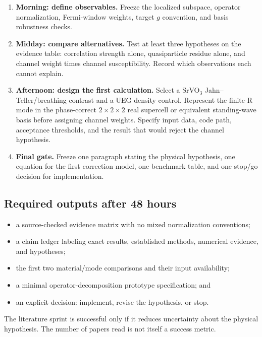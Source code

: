 \begin{enumerate}
  \item \textbf{Morning: define observables.}  Freeze the localized subspace,
  operator normalization, Fermi-window weights, target $g$ convention, and basis
  robustness checks.
  \item \textbf{Midday: compare alternatives.}  Test at least three hypotheses on
  the evidence table: correlation strength alone, quasiparticle residue alone,
  and channel weight times channel susceptibility.  Record which observations
  each cannot explain.
  \item \textbf{Afternoon: design the first calculation.}  Select a SrVO$_3$
  Jahn--Teller/breathing contrast and a UEG density control.  Represent the
  finite-R mode in the phase-correct $2\times2\times2$ real supercell or equivalent
  standing-wave basis before assigning channel weights.  Specify input data, code
  path, acceptance thresholds, and the result that would reject the channel hypothesis.
  \item \textbf{Final gate.}  Freeze one paragraph stating the physical
  hypothesis, one equation for the first correction model, one benchmark table,
  and one stop/go decision for implementation.
\end{enumerate}

\subsection*{Required outputs after 48 hours}

\begin{itemize}
  \item a source-checked evidence matrix with no mixed normalization conventions;
  \item a claim ledger labeling exact results, established methods, numerical
  evidence, and hypotheses;
  \item the first two material/mode comparisons and their input availability;
  \item a minimal operator-decomposition prototype specification; and
  \item an explicit decision: implement, revise the hypothesis, or stop.
\end{itemize}

The literature sprint is successful only if it reduces uncertainty about the
physical hypothesis.  The number of papers read is not itself a success metric.

